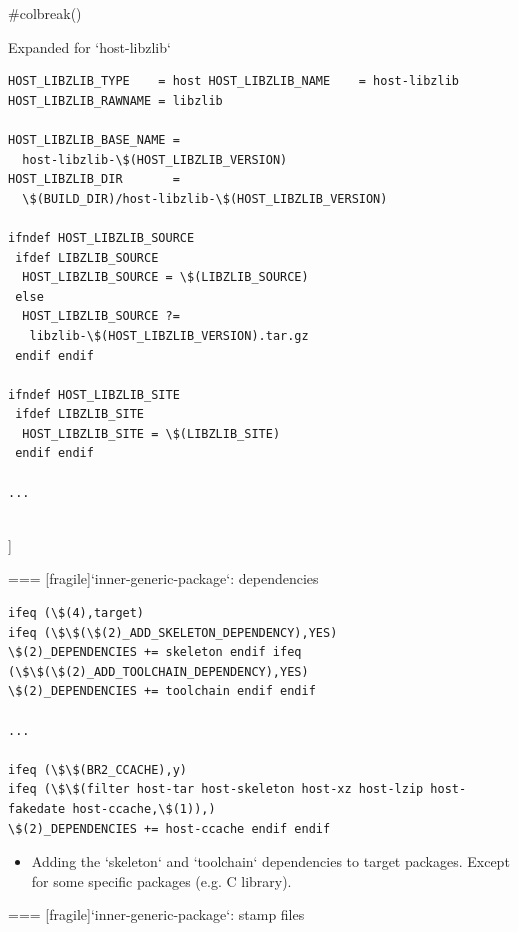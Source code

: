  #colbreak()
\begin{block}{Expanded for `host-libzlib`}
\begin{verbatim}
HOST_LIBZLIB_TYPE    = host HOST_LIBZLIB_NAME    = host-libzlib HOST_LIBZLIB_RAWNAME = libzlib

HOST_LIBZLIB_BASE_NAME =
  host-libzlib-\$(HOST_LIBZLIB_VERSION)
HOST_LIBZLIB_DIR       =
  \$(BUILD_DIR)/host-libzlib-\$(HOST_LIBZLIB_VERSION)

ifndef HOST_LIBZLIB_SOURCE
 ifdef LIBZLIB_SOURCE
  HOST_LIBZLIB_SOURCE = \$(LIBZLIB_SOURCE)
 else
  HOST_LIBZLIB_SOURCE ?=
   libzlib-\$(HOST_LIBZLIB_VERSION).tar.gz
 endif endif

ifndef HOST_LIBZLIB_SITE
 ifdef LIBZLIB_SITE
  HOST_LIBZLIB_SITE = \$(LIBZLIB_SITE)
 endif endif

...
\end{verbatim}
\end{block}

\\]



=== [fragile]{`inner-generic-package`: dependencies}

\begin{block}{}
\begin{verbatim}
ifeq (\$(4),target)
ifeq (\$\$(\$(2)_ADD_SKELETON_DEPENDENCY),YES)
\$(2)_DEPENDENCIES += skeleton endif ifeq (\$\$(\$(2)_ADD_TOOLCHAIN_DEPENDENCY),YES)
\$(2)_DEPENDENCIES += toolchain endif endif

...

ifeq (\$\$(BR2_CCACHE),y)
ifeq (\$\$(filter host-tar host-skeleton host-xz host-lzip host-fakedate host-ccache,\$(1)),)
\$(2)_DEPENDENCIES += host-ccache endif endif
\end{verbatim}
\end{block}

\begin{itemize}
\item Adding the `skeleton` and `toolchain` dependencies to
  target packages. Except for some specific packages (e.g. C library).
\end{itemize}


=== [fragile]{`inner-generic-package`: stamp files}


